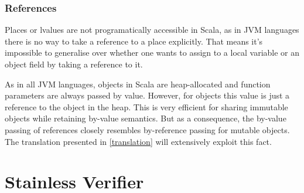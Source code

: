 \subsubsection{References}

Places or lvalues are not programatically accessible in Scala, as in JVM
languages there is no way to take a reference to a place explicitly. That means
it's impossible to generalise over whether one wants to assign to a local
variable or an object field by taking a reference to it.

As in all JVM languages, objects in Scala are heap-allocated and function
parameters are always passed by value. However, for objects this value is just a
reference to the object in the heap. This is very efficient for sharing
immutable objects while retaining by-value semantics. But as a consequence, the
by-value passing of references closely resembles by-reference passing for
mutable objects. The translation presented in \autoref{translation} will
extensively exploit this fact.

\section{Stainless Verifier}
